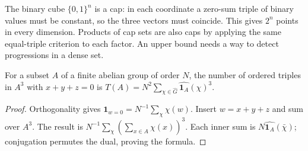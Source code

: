 The binary cube $\{0,1\}^n$ is a cap: in each coordinate a zero-sum triple of binary values must be constant, so the three vectors must coincide. This gives $2^n$ points in every dimension. Products of cap sets are also caps by applying the same equal-triple criterion to each factor. An upper bound needs a way to detect progressions in a dense set.

\begin{lemma}\label{lem:capcount}
For a subset $A$ of a finite abelian group of order $N$, the number of ordered triples in $A^3$ with $x+y+z=0$ is
$T(A)=N^2\sum_{\chi\in\widehat G}\widehat{\mathbf1_A}(\chi)^3$.
\end{lemma}
\begin{proof}
Orthogonality gives $\mathbf1_{w=0}=N^{-1}\sum_\chi\chi(w)$. Insert $w=x+y+z$ and sum over $A^3$. The result is $N^{-1}\sum_\chi(\sum_{x\in A}\chi(x))^3$. Each inner sum is $N\widehat{\mathbf1_A}(\bar\chi)$; conjugation permutes the dual, proving the formula.
\end{proof}

